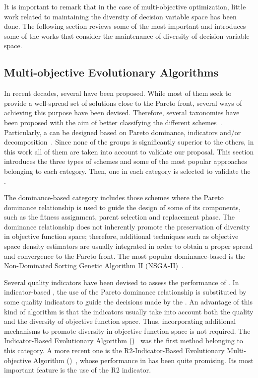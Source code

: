 It is important to remark that in the case of multi-objective optimization, little work related to maintaining the 
diversity of decision variable space has been done.
%
The following section reviews some of the most important \MOEAS{} and introduces some of the works that consider
the maintenance of diversity of decision variable space.

\subsection{Multi-objective Evolutionary Algorithms}

In recent decades, several \MOEAS{} have been proposed. 
%
While most of them seek to provide a well-spread set of solutions close to the Pareto front,
several ways of achieving this purpose have been devised.
%
Therefore, several taxonomies have been proposed with the aim of better classifying the different 
schemes~\cite{Joel:BOOK_MOEAs}.
%
Particularly, a \MOEA{} can be designed based on Pareto dominance, indicators and/or decomposition~\cite{Joel:StateArt}.
%
Since none of the groups is significantly superior to the others, in this work all of them are taken into account to validate
our proposal.
%
This section introduces the three types of schemes and some of the most popular approaches belonging to each category.
%
Then, one \MOEA{} in each category is selected to validate the \VSDMOEA{}.

The dominance-based category includes those schemes where the Pareto dominance relationship is used to guide the 
design of some of its components, such as the fitness assignment, parent selection and replacement phase.
%
The dominance relationship does not inherently promote the preservation of diversity in objective function space; 
therefore, additional techniques such as objective space density estimators are usually integrated in order to obtain 
a proper spread and convergence to the Pareto front.
%
The most popular dominance-based \MOEA{} is the Non-Dominated Sorting Genetic Algorithm II (NSGA-II)~\cite{Joel:NSGAII}.
%

Several quality indicators have been devised to assess the performance of \MOEAS{}.
%
In indicator-based \MOEAS{}, the use of the Pareto dominance relationship is substituted by some quality indicators 
to guide the decisions made by the \MOEA{}.
%
An advantage of this kind of algorithm is that the indicators usually take into account both the quality and 
the diversity of objective function space. Thus, incorporating additional mechanisms to promote diversity in 
objective function space is not required.
%
The Indicator-Based Evolutionary Algorithm (\IBEA{})~\cite{Joel:IBEA} was the first method belonging to this category.
%
A more recent one is the R2-Indicator-Based Evolutionary Multi-objective Algorithm (\RMOEA{})~\cite{trautmann2013r2}, 
whose performance in \MOPS{} has been quite promising.
%
Its most important feature is the use of the R2 indicator.

